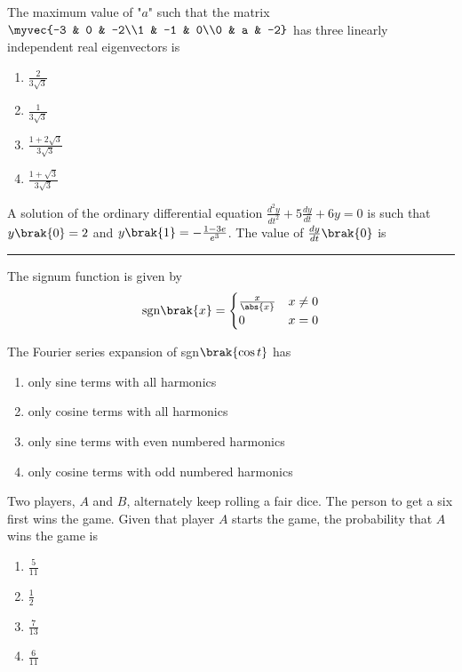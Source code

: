 	\item The maximum value of "$a$" such that the matrix $\myvec{-3 & 0 & -2\\1 & -1 & 0\\0 & a & -2}$ has three linearly independent real eigenvectors is

	\hfill{}
	\begin{enumerate}
		\item $\frac{2}{3\sqrt{3}}$
		\item $\frac{1}{3\sqrt{3}}$
		\item $\frac{1 + 2\sqrt{3}}{3\sqrt{3}}$
		\item $\frac{1 + \sqrt{3}}{3\sqrt{3}}$
	\end{enumerate}

    \item A solution of the ordinary differential equation $\frac{d^2y}{dt^2} + 5\frac{dy}{dt} + 6y = 0$ is such that $y\brak{0} = 2$ and $y\brak{1} = -\frac{1 - 3e}{e^3}$. The value of $\frac{dy}{dt}\brak{0}$ is \rule{1cm}{0.15mm}
	\hfill{}

    \item The signum function is given by
	\begin{align*}
		\text{sgn}\brak{x} =
		\begin{cases}
			\frac{x}{\abs{x}} & x \neq 0\\
			0 & x = 0
		\end{cases}
	\end{align*}

	The Fourier series expansion of sgn$\brak{\cos{t}}$ has
	\hfill{}

	\begin{enumerate}
		\item only sine terms with all harmonics
		\item only cosine terms with all harmonics
		\item only sine terms with even numbered harmonics
		\item only cosine terms with odd numbered harmonics
	\end{enumerate}

    \item Two players, $A$ and $B$, alternately keep rolling a fair dice. The person to get a six first wins the game. Given that player $A$ starts the game, the probability that $A$ wins the game is
	\hfill{}

	\begin{enumerate}
		\item $\frac{5}{11}$
		\item $\frac{1}{2}$
		\item $\frac{7}{13}$
		\item $\frac{6}{11}$
	\end{enumerate}